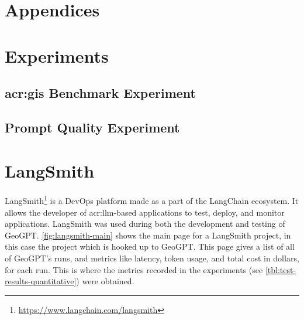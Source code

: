 \begin{appendix}
    \chapter*{Appendices}
    \label{cha:appendices}




    \chapter{Experiments}
    \label{app:experiments}

    \section[GIS Benchmark Experiment]{\acrshort{acr:gis} Benchmark Experiment}
    \label{appsec:questions-and-answer}

    
    \newpage
    

    \newpage

    \section{Prompt Quality Experiment}
    
    \newpage
    

    \chapter{LangSmith}
    \label{app:langsmith}

    LangSmith\footnote{\url{https://www.langchain.com/langsmith}} is a DevOps platform made as a part of the LangChain ecosystem. It allows the developer of \acrshort{acr:llm}-based applications to test, deploy, and monitor applications. LangSmith was used during both the development and testing of GeoGPT. \autoref{fig:langsmith-main} shows the main page for a LangSmith project, in this case the project which is hooked up to GeoGPT. This page gives a list of all of GeoGPT's runs, and metrics like latency, token usage, and total cost in dollars, for each run. This is where the metrics recorded in the experiments (see \autoref{tbl:test-results-quantitative}) were obtained.


\end{appendix}
